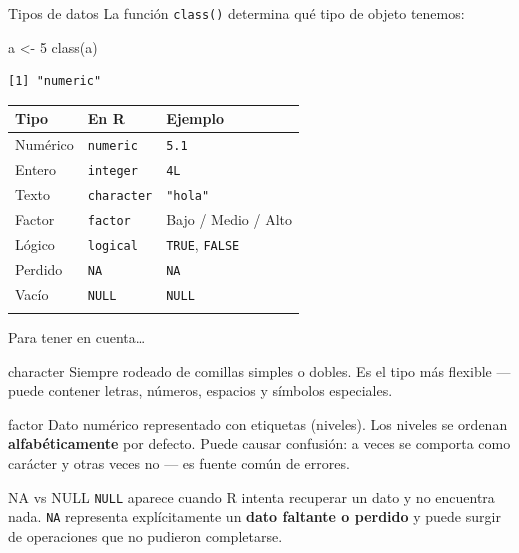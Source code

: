 \documentclass[
  9pt,
  ignorenonframetext,
]{beamer}
\newenvironment{Shaded}{\begin{snugshade}}{\end{snugshade}}
\newcommand{\DecValTok}[1]{\textcolor[rgb]{0.68,0.00,0.00}{#1}}
\newcommand{\FunctionTok}[1]{\textcolor[rgb]{0.28,0.35,0.67}{#1}}
\newcommand{\NormalTok}[1]{\textcolor[rgb]{0.00,0.23,0.31}{#1}}
\newcommand{\OtherTok}[1]{\textcolor[rgb]{0.00,0.23,0.31}{#1}}
\begin{document}
\begin{frame}[fragile]{Tipos de datos}
\label{tipos-de-datos}
La función \texttt{class()} determina qué tipo de objeto tenemos:

\begin{Shaded}
\begin{Highlighting}[]
\NormalTok{a }\OtherTok{\textless{}{-}} \DecValTok{5}
\FunctionTok{class}\NormalTok{(a)}
\end{Highlighting}
\end{Shaded}

\begin{verbatim}
[1] "numeric"
\end{verbatim}

\begin{longtable}[]{@{}lll@{}}
\toprule\noalign{}
Tipo & En R & Ejemplo \\
\midrule\noalign{}
\endhead
Numérico & \texttt{numeric} & \texttt{5.1} \\
Entero & \texttt{integer} & \texttt{4L} \\
Texto & \texttt{character} & \texttt{"hola"} \\
Factor & \texttt{factor} & Bajo / Medio / Alto \\
Lógico & \texttt{logical} & \texttt{TRUE}, \texttt{FALSE} \\
Perdido & \texttt{NA} & \texttt{NA} \\
Vacío & \texttt{NULL} & \texttt{NULL} \\
\bottomrule\noalign{}
\end{longtable}
\end{frame}

\begin{frame}{Para tener en cuenta\ldots{}}
\label{para-tener-en-cuenta}
\begin{block}{character}
Siempre rodeado de comillas simples o dobles. Es el tipo más flexible — puede contener letras, números, espacios y símbolos especiales.
\end{block}

\begin{alertblock}{factor}
Dato numérico representado con etiquetas (niveles). Los niveles se ordenan \textbf{alfabéticamente} por defecto. Puede causar confusión: a veces se comporta como carácter y otras veces no — es fuente común de errores.
\end{alertblock}

\begin{exampleblock}{NA vs NULL}
\texttt{NULL} aparece cuando R intenta recuperar un dato y no encuentra nada. \texttt{NA} representa explícitamente un \textbf{dato faltante o perdido} y puede surgir de operaciones que no pudieron completarse.
\end{exampleblock}
\end{frame}
\end{document}
